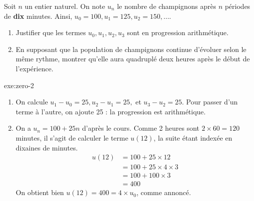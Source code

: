 {	Soit $n$ un entier naturel.
	On note $u_n$ le nombre de champignons après $n$ périodes de \textbf{dix} minutes.
	Ainsi, $u_0 = 100, u_1 = 125, u_2 = 150, \dots$.
	\begin{enumerate}
		\item Justifier que les termes $u_0, u_1, u_2, u_3$ sont en progression arithmétique.
		\item En supposant que la population de champignons continue d'évoluer selon le même rythme, montrer qu'elle aura quadruplé deux heures après le début de l'expérience.
	\end{enumerate}
}{exe:zero-2}{
	\begin{enumerate}
		\item
		On calcule $u_1 - u_0 = 25, u_2 - u_1 = 25,$ et $u_3 - u_2 = 25$.
		Pour passer d'un terme à l'autre, on ajoute 25 : la progression est arithmétique.
		\item 
		On a $u_n = 100 + 25n$ d'après le cours.
		Comme 2 heures sont $2 \times60 = 120$ minutes, il s'agit de calculer le terme $u(12)$, la suite étant indexée en dixaines de minutes.
		\begin{align*}
			u(12) &= 100 + 25\times12 \\
					&= 100 + 25 \times 4 \times 3 \\
					&= 100 + 100 \times 3 \\
					&= 400
		\end{align*}
		On obtient bien $u(12) = 400 = 4 \times u_0$, comme annoncé.
	\end{enumerate}
}





\newpage
{}
\shipoutAnswer


